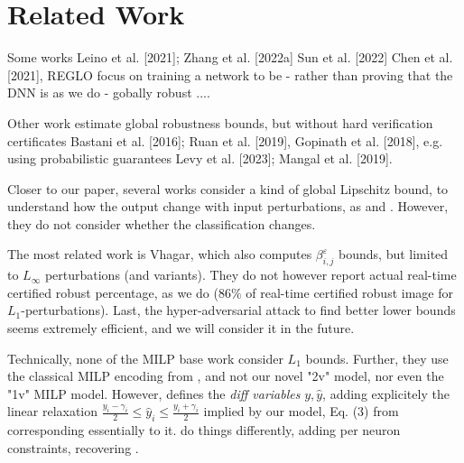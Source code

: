 \section{Related Work}

Some works 
Leino et al. [2021]; Zhang et al. [2022a] Sun et al. [2022]  Chen et al. [2021], REGLO focus on training a network to be - rather than proving that the DNN is as we do - gobally robust ....

Other work estimate global robustness bounds, but without hard verification certificates Bastani et al. [2016]; Ruan et al. [2019], Gopinath et al. [2018], e.g. using probabilistic guarantees  Levy et al. [2023]; Mangal et al. [2019].

Closer to our paper, several works consider a kind of global Lipschitz bound, to understand how the output change with input perturbations, as \cite{marabou} and \cite{ITNE,GROCET}. However, they do not consider whether the classification changes. 

The most related work is Vhagar, which also computes $\beta^\varepsilon_{i,j}$ bounds, but limited to $L_\infty$ perturbations (and variants). They do not however report actual 
real-time certified robust percentage, as we do ($86\%$ of real-time
certified robust image for $L_1$-perturbations). Last, the hyper-adversarial attack to find better lower bounds seems extremely efficient, and we will consider it in the future.

Technically, none of the MILP base work \cite{Vhagar,ITNE,GROCET} 
consider $L_1$ bounds. Further, they use the classical MILP encoding from \cite{MILP}, and not our novel "2v" model, nor even the "1v" MILP model. However, \cite{ITNE,GROCET} 
defines the {\em diff variables} $y,\hat{y}$, adding explicitely the linear relaxation $\frac{y_i-\gamma_i}{2} \leq \hat{y}_i \leq \frac{y_i+\gamma_i}{2}$ implied by our model, Eq. (3) from \cite{ITNE} corresponding essentially to it. \cite{Vhagar} do things differently, adding per neuron constraints, recovering . 

